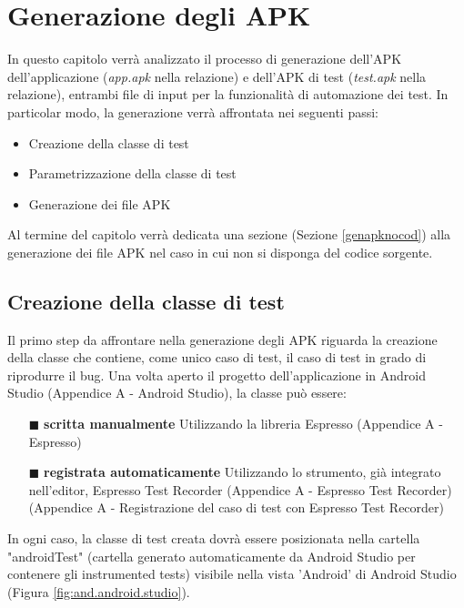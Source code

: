 \chapter{Generazione degli APK}
\label{genapk}
In questo capitolo verrà analizzato il processo di generazione dell'APK dell'applicazione (\emph{app.apk} nella relazione) e dell'APK di test (\emph{test.apk} nella relazione), entrambi file di input per la funzionalità di automazione dei test. In particolar modo, la generazione verrà affrontata nei seguenti passi:
\begin{itemize}[nosep]
\item Creazione della classe di test 
\item Parametrizzazione della classe di test
\item Generazione dei file APK
\end{itemize}
\noindent Al termine del capitolo verrà dedicata una sezione (Sezione \ref{genapknocod}) alla generazione dei file APK nel caso in cui non si disponga del codice sorgente.

\section{Creazione della classe di test}
\label{creazioneclassetest}
Il primo step da affrontare nella generazione degli APK riguarda la creazione della classe che contiene, come unico caso di test, il caso di test in grado di riprodurre il bug. Una volta aperto il progetto dell'applicazione in Android Studio (Appendice A - Android Studio), la classe può essere:
\begin{itemize}[nosep]
\item [$\blacksquare$]\textbf{scritta manualmente} \newline
Utilizzando la libreria Espresso (Appendice A - Espresso)
\item [$\blacksquare$]\textbf{registrata automaticamente} \newline
Utilizzando lo strumento, già integrato nell’editor, Espresso Test Recorder  (Appendice A - Espresso Test Recorder) (Appendice A - Registrazione del caso di test con Espresso Test Recorder) 
\end{itemize}
In ogni caso, la classe di test creata dovrà essere posizionata nella cartella "androidTest" (cartella generato automaticamente da Android Studio per contenere gli instrumented tests) visibile nella vista 'Android' di Android Studio (Figura \ref{fig:and.android.studio}).


